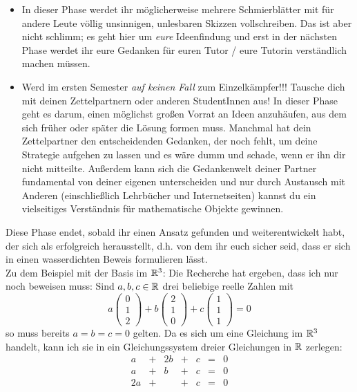 \begin{de}
\begin{itemize}
   \item In dieser Phase werdet ihr möglicherweise mehrere Schmierblätter mit für andere Leute völlig unsinnigen, unlesbaren Skizzen vollschreiben. Das ist aber nicht schlimm; es geht hier um \emph{eure} Ideenfindung und erst in der nächsten Phase werdet ihr eure Gedanken für euren Tutor / eure Tutorin verständlich machen müssen.
   \item Werd im ersten Semester \emph{auf keinen Fall} zum Einzelkämpfer!!! Tausche dich mit deinen Zettelpartnern oder anderen StudentInnen aus! In dieser Phase geht es darum, einen möglichst großen Vorrat an Ideen anzuhäufen, aus dem sich früher oder später die Lösung formen muss. Manchmal hat dein Zettelpartner den entscheidenden Gedanken, der noch fehlt, um deine Strategie aufgehen zu lassen und es wäre dumm und schade, wenn er ihn dir nicht mitteilte. Außerdem kann sich die Gedankenwelt deiner Partner fundamental von deiner eigenen unterscheiden und nur durch Austausch mit Anderen (einschließlich Lehrbücher und Internetseiten) kannst du ein vielseitiges Verständnis für mathematische Objekte gewinnen.
  \end{itemize}
  Diese Phase endet, sobald ihr einen Ansatz gefunden und weiterentwickelt habt, der sich als erfolgreich herausstellt, d.h. von dem ihr euch sicher seid, dass er sich in einen wasserdichten Beweis formulieren lässt. \\[0.5em]
  Zu dem Beispiel mit der Basis im ${\mathbb R}^3$: Die Recherche hat ergeben, dass ich nur noch beweisen muss: Sind $a,b,c\in {\mathbb R}$ drei beliebige reelle Zahlen mit
  \[ a\begin{pmatrix} 0 \\ 1 \\ 2 \end{pmatrix} + b \begin{pmatrix} 2 \\ 1 \\ 0 \end{pmatrix}+c \begin{pmatrix} 1 \\ 1 \\ 1 \end{pmatrix} = 0  \]
  so muss bereits $a=b=c=0$ gelten. Da es sich um eine Gleichung im ${\mathbb R}^3$ handelt, kann ich sie in ein Gleichungssystem dreier Gleichungen in ${\mathbb R}$ zerlegen:
\[  \begin{array}{ccccccc}
      a &+& 2b &+& c &=& 0 \\
   a &+& b &+& c & =& 0 \\
   2a &+& &+ &c & =& 0

\end{array}\]
\end{de}
